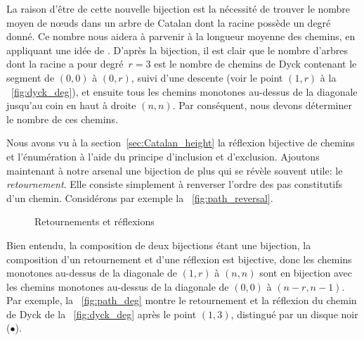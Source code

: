 La raison d'être de cette nouvelle bijection est la nécessité de
trouver le nombre moyen de n{\oe}uds dans un arbre de Catalan dont la
racine possède un degré donné. Ce nombre nous aidera à parvenir à la
longueur moyenne des chemins, en appliquant une idée de
\cite{Ruskey_1983}. D'après la bijection, il est clair que le nombre
d'arbres dont la racine a pour degré~\(r=3\) est le nombre de chemins
de Dyck contenant le segment de \((0,0)\) à \((0,r)\), suivi d'une
descente (voir le point \((1,r)\) à la \fig~\ref{fig:dyck_deg}), et
ensuite tous les chemins monotones au-dessus de la diagonale jusqu'au
coin en haut à droite \((n,n)\).  Par conséquent, nous devons
déterminer le nombre de ces chemins.

Nous avons vu à la section~\vref{sec:Catalan_height} la réflexion
bijective de chemins et l'énumération à l'aide du principe d'inclusion
et d'exclusion. Ajoutons maintenant à notre arsenal une bijection de
plus qui se révèle souvent utile: le \emph{retournement}. Elle
consiste simplement à renverser l'ordre des pas constitutifs d'un
chemin. Considérons par exemple la \fig~\ref{fig:path_reversal}.
\begin{figure}
\centering
{}
\qquad
{}
\caption{Retournements et réflexions}
\end{figure}
Bien entendu, la composition de deux bijections étant une bijection,
la composition d'un retournement et d'une réflexion est bijective,
donc les chemins monotones au-dessus de la diagonale de \((1,r)\) à
\((n,n)\) sont en bijection avec les chemins monotones au-dessus de la
diagonale de \((0,0)\) à \((n-r,n-1)\). Par exemple, la
\fig~\ref{fig:path_deg} montre le retournement et la réflexion du
chemin de Dyck de la \fig~\ref{fig:dyck_deg} après le point \((1,3)\),
distingué par un disque noir (\(\bullet\)).

